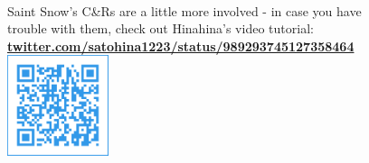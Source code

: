 \vspace{\fill}\\
{\small Saint Snow's C\&Rs are a little more involved - in case you have\\
trouble with them, check out Hinahina's video tutorial:\\
\textbf{\textcolor{aqours}{\hyperlink{https://twitter.com/satohina1223/status/989293745127358464}{twitter.com/satohina1223/status/989293745127358464}}}}
\vspace{-5.66em}\\
\hspace*{\fill}\includegraphics[height=8em,keepaspectratio]{images/qr_hinahina_video.pdf}
\vspace{\fill}

\ifdefined\COMPLETE
\else
	
\fi